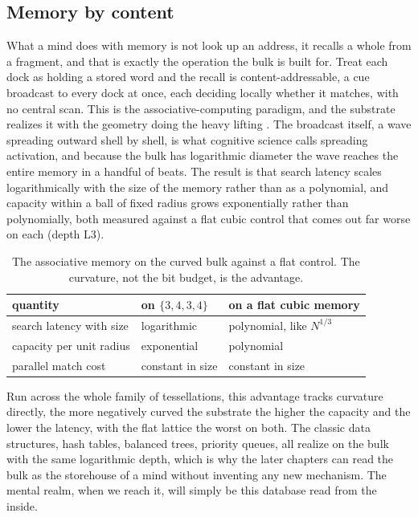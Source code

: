 \subsection{Memory by content}

What a mind does with memory is not look up an address, it recalls a whole from a fragment, and that is exactly the operation the bulk is built for. Treat each dock as holding a stored word and the recall is content-addressable, a cue broadcast to every dock at once, each deciding locally whether it matches, with no central scan. This is the associative-computing paradigm, and the substrate realizes it with the geometry doing the heavy lifting \cite{potter1992}. The broadcast itself, a wave spreading outward shell by shell, is what cognitive science calls spreading activation, and because the bulk has logarithmic diameter the wave reaches the entire memory in a handful of beats. The result is that search latency scales logarithmically with the size of the memory rather than as a polynomial, and capacity within a ball of fixed radius grows exponentially rather than polynomially, both measured against a flat cubic control that comes out far worse on each (depth L3).

\begin{table}[ht]
\centering
\begin{tabular}{@{}lll@{}}
\toprule
quantity & on $\{3,4,3,4\}$ & on a flat cubic memory \\
\midrule
search latency with size & logarithmic & polynomial, like $N^{1/3}$ \\
capacity per unit radius & exponential & polynomial \\
parallel match cost & constant in size & constant in size \\
\bottomrule
\end{tabular}
\caption{The associative memory on the curved bulk against a flat control. The curvature, not the bit budget, is the advantage.}
\label{tab:assoc}
\end{table}

Run across the whole family of tessellations, this advantage tracks curvature directly, the more negatively curved the substrate the higher the capacity and the lower the latency, with the flat lattice the worst on both. The classic data structures, hash tables, balanced trees, priority queues, all realize on the bulk with the same logarithmic depth, which is why the later chapters can read the bulk as the storehouse of a mind without inventing any new mechanism. The mental realm, when we reach it, will simply be this database read from the inside.

